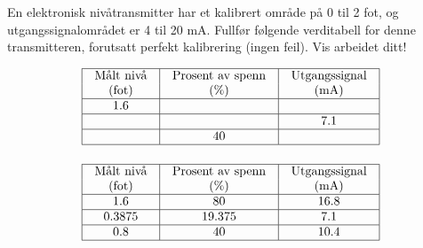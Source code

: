 

En elektronisk nivåtransmitter har et kalibrert område på 0 til 2 fot, og utgangssignalområdet er 4 til 20 mA.  Fullfør følgende verditabell for denne transmitteren, forutsatt perfekt kalibrering (ingen feil).  Vis arbeidet ditt!


$$\vbox{\offinterlineskip
\halign{\strut
\vrule \quad\hfil # \ \hfil & 
\vrule \quad\hfil # \ \hfil & 
\vrule \quad\hfil # \ \hfil \vrule \cr
\noalign{\hrule}
%
Målt nivå & Prosent av spenn & Utgangssignal \cr
%
(fot) & (\%) & (mA) \cr
%
\noalign{\hrule}
%
1.6 &  &  \cr
%
\noalign{\hrule}
%
 &  & 7.1 \cr
%
\noalign{\hrule}
%
 & 40 &  \cr
%
\noalign{\hrule}
} %
}$$ %








$$\vbox{\offinterlineskip
\halign{\strut
\vrule \quad\hfil # \ \hfil & 
\vrule \quad\hfil # \ \hfil & 
\vrule \quad\hfil # \ \hfil \vrule \cr
\noalign{\hrule}
%
Målt nivå & Prosent av spenn & Utgangssignal \cr
%
(fot) & (\%) & (mA) \cr
%
\noalign{\hrule}
%
1.6 & 80 & 16.8 \cr
%
\noalign{\hrule}
%
0.3875 & 19.375 & 7.1 \cr
%
\noalign{\hrule}
%
0.8 & 40 & 10.4 \cr
%
\noalign{\hrule}
} %
}$$ %










